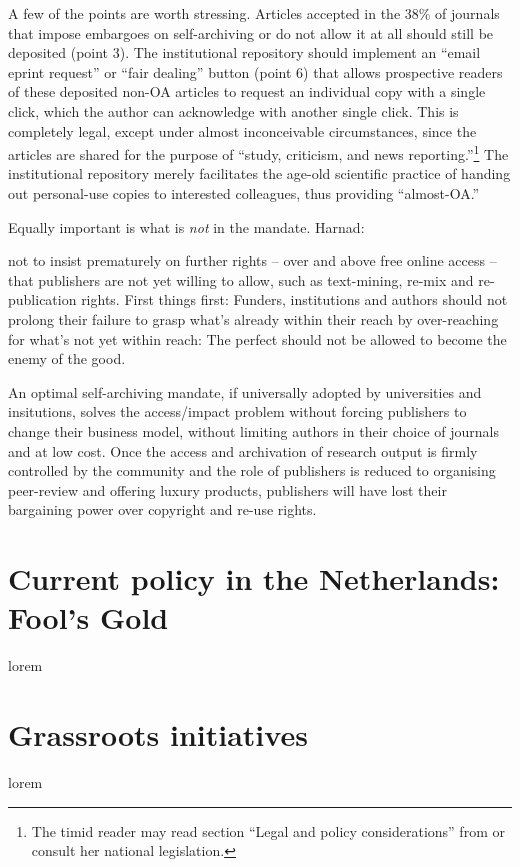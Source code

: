 \documentclass[11pt, openany, oneside, article, a4paper, twocolumn]{memoir}
\begin{document}
A few of the points are worth stressing. Articles accepted in the 38\%
\cite{bjork2014anatomy} of journals that impose embargoes on
self-archiving or do not allow it at all should still be deposited (point
3).
The institutional repository should implement an \enquote{email eprint
request} or \enquote{fair dealing} button \cite{sale2010open} (point 6) that allows
prospective readers of these deposited non-OA articles to request an individual
copy with a single click, which the author can acknowledge with
another single click. This is completely legal, except under almost
inconceivable circumstances, since the articles are shared for the purpose of
\enquote{study, criticism, and news reporting.}\footnote{The timid reader may
read section \enquote{Legal and policy considerations} from \cite{sale2010open}
or consult her national legislation.} The institutional repository merely
facilitates the age-old scientific practice of handing out personal-use copies
to interested colleagues, thus providing \enquote{almost-OA.}

Equally important is what is \emph{not} in the mandate. Harnad:
\begin{displayquote}
\begin{small}
[It is essential] not to insist prematurely on further rights
-- over and above free online access -- that publishers are not yet willing to
allow, such as text-mining, re-mix and re-publication rights. First things
first: Funders, institutions and authors should not prolong their failure to
grasp what's already within their reach by over-reaching for what's not yet
within reach: The perfect should not be allowed to become the enemy of the
good.
\end{small}
\end{displayquote}
An optimal self-archiving mandate, if universally adopted by universities and insitutions, solves
the access/impact problem without forcing publishers to change
their business model, without limiting authors in their choice of journals and at low cost.
Once the access and archivation of research output is firmly controlled by the community
and the role of publishers is reduced to organising peer-review and offering luxury products, 
publishers will have lost their bargaining power over copyright and re-use rights.

\section{Current policy in the Netherlands: Fool's Gold}

lorem

\section{Grassroots initiatives}

lorem

\printbibliography

\end{document}
